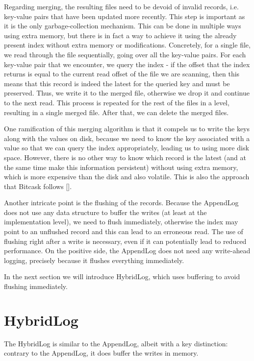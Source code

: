 Regarding merging, the resulting files need to be devoid of invalid records, i.e. key-value pairs that have been updated more recently. This step is important as it is the only garbage-collection mechanism. This can be done in multiple ways using extra memory, but there is in fact a way to achieve it using the already present index without extra memory or modifications. Concretely, for a single file, we read through the file sequentially, going over all the key-value pairs. For each key-value pair that we encounter, we query the index - if the offset that the index returns is equal to the current read offset of the file we are scanning, then this means that this record is indeed the latest for the queried key and must be preserved. Thus, we write it to the merged file, otherwise we drop it and continue to the next read. This process is repeated for the rest of the files in a level, resulting in a single merged file. After that, we can delete the merged files.

One ramification of this merging algorithm is that it compels us to write the keys along with the values on disk, because we need to know the key associated with a value so that we can query the index appropriately, leading us to using more disk space. However, there is no other way to know which record is the latest (and at the same time make this information persistent) without using extra memory, which is more expensive than the disk and also volatile. This is also the approach that Bitcask follows [\cite{bitcask}].

Another intricate point is the flushing of the records. Because the AppendLog does not use any data structure to buffer the writes (at least at the implementation level), we need to flush immediately, otherwise the index may point to an unflushed record and this can lead to an erroneous read. The use of flushing right after a write is necessary, even if it can potentially lead to reduced performance. On the positive side, the AppendLog does not need any write-ahead logging, precisely because it flushes everything immediately.

In the next section we will introduce HybridLog, which uses buffering to avoid flushing immediately.

\section{HybridLog}

The HybridLog is similar to the AppendLog, albeit with a key distinction: contrary to the AppendLog, it does buffer the writes in memory.

